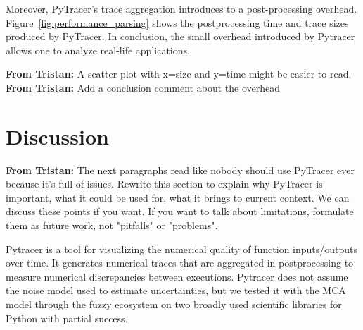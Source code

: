 \documentclass[11pt]{article}
\newcommand{\tristan}[1]{\color{orange}\textbf{From Tristan:} #1\color{black}\xspace}
\newcommand{\pytracer}[0]{PyTracer\xspace}
\begin{document}

Moreover, \pytracer's trace aggregation introduces to a post-processing overhead.
Figure~\ref{fig:performance_parsing} shows
the postprocessing time and trace sizes produced by \pytracer.
In conclusion, the small overhead introduced by Pytracer allows one to analyze real-life applications.

\tristan{A scatter plot with x=size and y=time might be easier to read.}
\tristan{Add a conclusion comment about the overhead}

\section{Discussion}


\tristan{The next paragraphs read like nobody should use \pytracer ever because it's full of issues. Rewrite this section to explain why \pytracer is important, what it could be used for, what it brings to current context. We can discuss these points if you want. If you want to talk about limitations, formulate them as future work, not "pitfalls" or "problems".}

Pytracer is a tool for visualizing the numerical quality of function inputs/outputs over time. It generates numerical traces that are aggregated in postprocessing to measure numerical discrepancies between executions. Pytracer does not assume the noise model used to estimate uncertainties, but we tested it with the MCA model
through the fuzzy ecosystem on two broadly used scientific libraries for Python with partial success.
\end{document}
